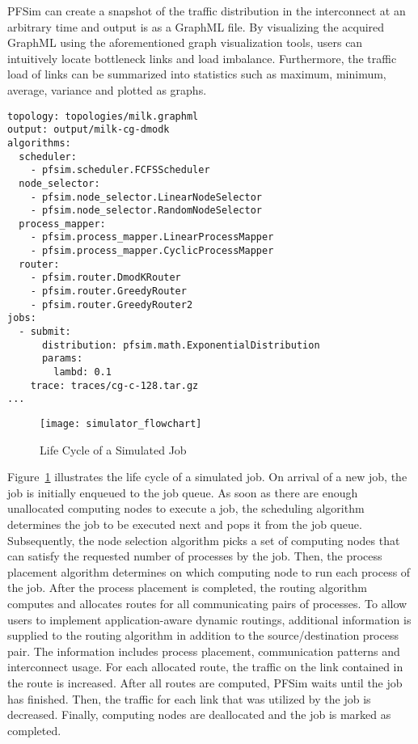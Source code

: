 PFSim can create a snapshot of the traffic distribution in the
interconnect at an arbitrary time and output is as a GraphML file. By
visualizing the acquired GraphML using the aforementioned graph
visualization tools, users can intuitively locate bottleneck links and
load imbalance. Furthermore, the traffic load of links can be summarized
into statistics such as maximum, minimum, average, variance and plotted
as graphs.

\begin{lstlisting}[caption={Example of a Simulation Scenario}, label={lst:simulation-scenario}, linewidth={\columnwidth}, float={htbp}]
topology: topologies/milk.graphml
output: output/milk-cg-dmodk
algorithms:
  scheduler:
    - pfsim.scheduler.FCFSScheduler
  node_selector:
    - pfsim.node_selector.LinearNodeSelector
    - pfsim.node_selector.RandomNodeSelector
  process_mapper:
    - pfsim.process_mapper.LinearProcessMapper
    - pfsim.process_mapper.CyclicProcessMapper
  router:
    - pfsim.router.DmodKRouter
    - pfsim.router.GreedyRouter
    - pfsim.router.GreedyRouter2
jobs:
  - submit:
      distribution: pfsim.math.ExponentialDistribution
      params:
        lambd: 0.1
    trace: traces/cg-c-128.tar.gz
...
\end{lstlisting}

\begin{figure}
    \centering
    \texttt{[image: simulator\_flowchart]}
    \caption{Life Cycle of a Simulated Job}%
    \label{fig:simulator-flowchart}
\end{figure}

Figure~\ref{fig:simulator-flowchart} illustrates the life cycle of a
simulated job. On arrival of a new job, the job is initially enqueued to
the job queue. As soon as there are enough unallocated computing nodes
to execute a job, the scheduling algorithm determines the job to be
executed next and pops it from the job queue. Subsequently, the node
selection algorithm picks a set of computing nodes that can satisfy the
requested number of processes by the job. Then, the process placement
algorithm determines on which computing node to run each process of the
job. After the process placement is completed, the routing algorithm
computes and allocates routes for all communicating pairs of processes.
To allow users to implement application-aware dynamic routings,
additional information is supplied to the routing algorithm in addition
to the source/destination process pair. The information includes process
placement, communication patterns and interconnect usage. For each
allocated route, the traffic on the link contained in the route is
increased. After all routes are computed, PFSim waits until the job has
finished. Then, the traffic for each link that was utilized by the job
is decreased. Finally, computing nodes are deallocated and the job is
marked as completed.

